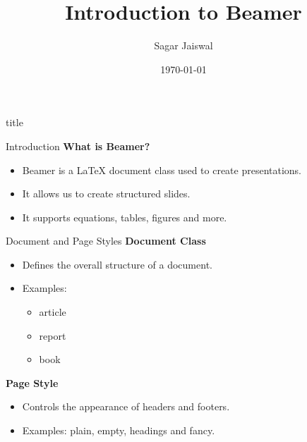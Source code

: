 \documentclass[11pt,aspectratio=43]{beamer}
\title{Introduction to Beamer}
\author{Sagar Jaiswal}
\institute{ID: 2025UCP1944}
\date{\today}
\begin{document}
\begin{frame}
  \vspace{1.35cm}
  \begin{center}
  \begin{beamercolorbox}[wd=.92\textwidth,rounded=true,shadow=true,sep=1.0em,center]{title}
    {\inserttitle}
  \end{beamercolorbox}
  \end{center}
  \vspace{0.65cm}
  \begin{center}
    {\Large \insertauthor}\par
    \vspace{0.28cm}
    {\normalsize \insertinstitute}\par
    \vspace{0.45cm}
    {\normalsize \insertdate}
  \end{center}
\end{frame}

\begin{frame}{Introduction}
  \vspace{0.55cm}
  \textbf{What is Beamer?}
  \begin{itemize}
    \item Beamer is a LaTeX document class used to create presentations.
    \item It allows us to create structured slides.
    \item It supports equations, tables, figures and more.
  \end{itemize}
\end{frame}

\begin{frame}{Document and Page Styles}
  \vspace{0.22cm}
  \textbf{Document Class}
  \begin{itemize}
    \item Defines the overall structure of a document.
    \item Examples:
    \begin{itemize}
      \item article
      \item report
      \item book
    \end{itemize}
  \end{itemize}

  \vspace{0.18cm}
  \textbf{Page Style}
  \begin{itemize}
    \item Controls the appearance of headers and footers.
    \item Examples: plain, empty, headings and fancy.
  \end{itemize}
\end{frame}
\end{document}
